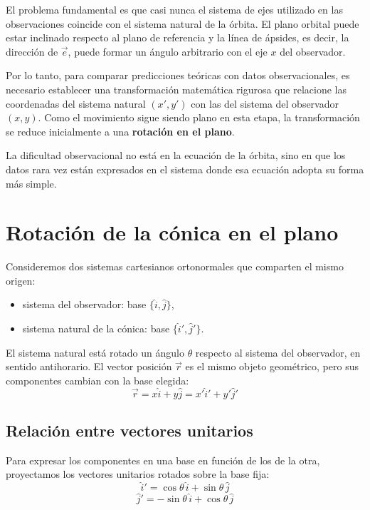 El problema fundamental es que casi nunca el sistema de ejes utilizado en las observaciones coincide con el sistema natural de la órbita. El plano orbital puede estar inclinado respecto al plano de referencia y la línea de ápsides, es decir, la dirección de \(\vec{e}\), puede formar un ángulo arbitrario con el eje \(x\) del observador.

Por lo tanto, para comparar predicciones teóricas con datos observacionales, es necesario establecer una transformación matemática rigurosa que relacione las coordenadas del sistema natural \((x',y')\) con las del sistema del observador \((x,y)\). Como el movimiento sigue siendo plano en esta etapa, la transformación se reduce inicialmente a una \textbf{rotación en el plano}.

\begin{importante}
La dificultad observacional no está en la ecuación de la órbita, sino en que los datos rara vez están expresados en el sistema donde esa ecuación adopta su forma más simple.
\end{importante}

\section{Rotación de la cónica en el plano}
Consideremos dos sistemas cartesianos ortonormales que comparten el mismo origen:
\begin{itemize}
    \item sistema del observador: base \(\{\hat{i}, \hat{j}\}\),
    \item sistema natural de la cónica: base \(\{\hat{i}', \hat{j}'\}\).
\end{itemize}

El sistema natural está rotado un ángulo \(\theta\) respecto al sistema del observador, en sentido antihorario. El vector posición \(\vec{r}\) es el mismo objeto geométrico, pero sus componentes cambian con la base elegida:
\[
\vec{r} = x\hat{i} + y\hat{j} = x'\hat{i}' + y'\hat{j}'
\]

\subsection{Relación entre vectores unitarios}
Para expresar los componentes en una base en función de los de la otra, proyectamos los vectores unitarios rotados sobre la base fija:
\[
\hat{i}' = \cos\theta\,\hat{i} + \sin\theta\,\hat{j}
\]
\[
\hat{j}' = -\sin\theta\,\hat{i} + \cos\theta\,\hat{j}
\]

